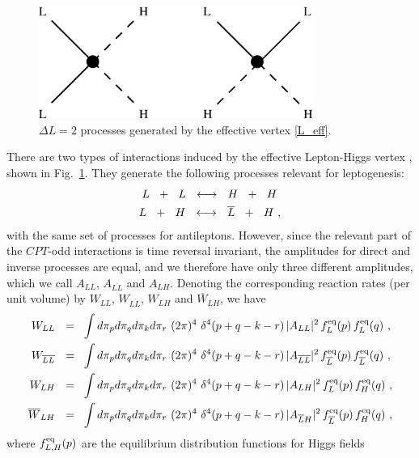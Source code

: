 \documentclass[12pt]{revtex4}
\newcommand{\eq}{{\rm eq}}
\newcommand{\ov}{\overline}
\begin{document}
\begin{figure}
\includegraphics[width=9cm]{lflip.eps}
\caption{$\Delta L=2$ processes generated by the effective vertex \eqref{L_eff}.}
\label{lflip_fig}
\end{figure}
There are two types of interactions induced by the effective
Lepton-Higgs vertex \cite{Luty:1992un,Plumacher:1996kc}, 
shown in  Fig.~\ref{lflip_fig}.
They generate the following processes relevant for leptogenesis:
\begin{align}
\notag
	L~~+~~L ~~\longleftrightarrow~~ H~~+~~H~  \\
\notag
	L~~+~~H ~~\longleftrightarrow~~ \ov{L}~~+~~H~,
\end{align}
with the same set of processes
for antileptons.
However, since the relevant part of the $CPT$-odd interactions is time reversal invariant, 
the amplitudes for
direct and inverse processes are equal, and we therefore have 
only three different amplitudes, which we call  
$ A_{LL} $, $ A_{\ov{LL}} $ and $ A_{LH} $.
Denoting the corresponding reaction rates (per unit volume) by
$ W_{LL} $, $ W_{\ov{LL}} $, $ W_{L{H}} $ and $ \ov{W}_{L{H}} $,
we have 
\begin{align*}
	W_{LL}   ~~=~~  &
		\int d\pi_p d\pi_q d\pi_k d\pi_r ~
		(2\pi)^4~ \delta^4 ( p + q - k - r )\,
		| A_{LL} |^2\, f_L^\eq(p)\, f_L^\eq(q)~, \\
	W_{\ov{LL}}   ~~=~~  &
		\int d\pi_p d\pi_q d\pi_k d\pi_r ~
		(2\pi)^4~ \delta^4 ( p + q - k - r )\,
		| A_{\ov{LL}} |^2\, f_{\ov{L}}^\eq(p)\, f_{\ov{L}}^\eq(q)~, \\
	W_{LH}  ~~=~~  &
		\int d\pi_p d\pi_q d\pi_k d\pi_r ~
		(2\pi)^4~ \delta^4 ( p + q - k - r )\,
		| A_{L{H}} |^2\, f_{{L}}^\eq(p)\, f_{{H}}^\eq(q)~, \\
	\ov{W}_{LH}  ~~=~~  &
		\int d\pi_p d\pi_q d\pi_k d\pi_r ~
		(2\pi)^4~ \delta^4 ( p + q - k - r )\,
		| A_{\ov{L}{H} }|^2\, f_{\ov{L}}^\eq(p)\, f_{H}^\eq(q)~,
\end{align*}
	where $ f_{L,H}^\eq(p) $ are the equilibrium distribution functions for Higgs fields
\end{document}
